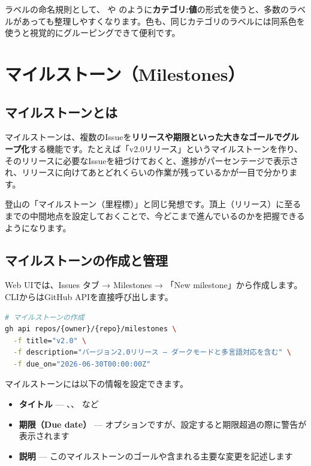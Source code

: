 ラベルの命名規則として、 や  のように\textbf{カテゴリ:値}の形式を使うと、多数のラベルがあっても整理しやすくなります。色も、同じカテゴリのラベルには同系色を使うと視覚的にグルーピングできて便利です。

\section{マイルストーン（Milestones）}

\subsection{マイルストーンとは}

マイルストーンは、複数のIssueを\textbf{リリースや期限といった大きなゴールでグループ化}する機能です。たとえば「v2.0リリース」というマイルストーンを作り、そのリリースに必要なIssueを紐づけておくと、進捗がパーセンテージで表示され、リリースに向けてあとどれくらいの作業が残っているかが一目で分かります。

登山の「マイルストーン（里程標）」と同じ発想です。頂上（リリース）に至るまでの中間地点を設定しておくことで、今どこまで進んでいるのかを把握できるようになります。

\subsection{マイルストーンの作成と管理}

Web UIでは、Issues タブ → Milestones → 「New milestone」から作成します。CLIからはGitHub APIを直接呼び出します。

\begin{lstlisting}[language=bash]
# マイルストーンの作成
gh api repos/{owner}/{repo}/milestones \
  -f title="v2.0" \
  -f description="バージョン2.0リリース — ダークモードと多言語対応を含む" \
  -f due_on="2026-06-30T00:00:00Z"
\end{lstlisting}

マイルストーンには以下の情報を設定できます。

\begin{itemize}
  \item \textbf{タイトル} --- 、、 など
  \item \textbf{期限（Due date）} --- オプションですが、設定すると期限超過の際に警告が表示されます
  \item \textbf{説明} --- このマイルストーンのゴールや含まれる主要な変更を記述します
\end{itemize}

